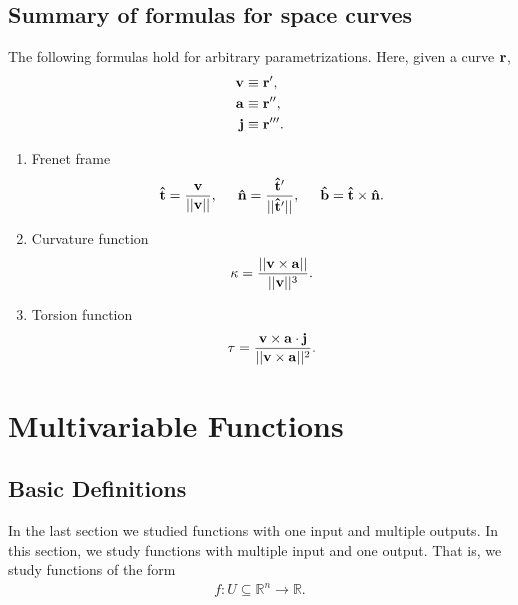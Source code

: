 \documentclass[12pt,letterpaper,reqno]{article}
\numberwithin{equation}{section}
\newcommand{\R}{\ensuremath{\mathbb R}}
\newcommand{\bv}{{\bf v}}
\newcommand{\ba}{{\bf a}}
\newcommand{\bbr}{{\bf r}}
\newcommand{\ut}{{\bf {\hat{t}}}}
\newcommand{\un}{{\bf {\hat{n}}}}
\newcommand{\ub}{{\bf {\hat{b}}}}
\newcommand{\bj}{{\bf j}}
\begin{document}
{\subsection{Summary of formulas for space curves}
The following formulas hold for arbitrary parametrizations. Here, given a curve $\bbr$,
\begin{align*}
	\bv &\equiv \bbr', \\
	\ba &\equiv \bbr'', \\
	\bj &\equiv \bbr'''. \\
\end{align*}
\begin{enumerate}
	\item Frenet frame
	\begin{align*}
		\ut=\frac{\bv}{||\bv||}, \hspace{0.5cm} \un = \frac{\ut'}{||\ut'||}, \hspace{0.5cm} \ub=\ut \times \un.
	\end{align*}
	\item Curvature function
	\begin{align*}
		\kappa=\frac{||\bv \times \ba||}{||\bv||^3}.
	\end{align*}
	\item Torsion function
	\begin{align*}
		\tau=\frac{\bv \times \ba \cdot {\bf j}}{||\bv \times \ba||^2}.
	\end{align*}
\end{enumerate}

\section{Multivariable Functions}
\subsection{Basic Definitions}
In the last section we studied functions with one input and multiple outputs. In this section, we study functions with multiple input and one output. That is, we study functions of the form
\begin{align*}
	f:U \subseteq \R^n \to \R.
\end{align*}

}
\end{document}
